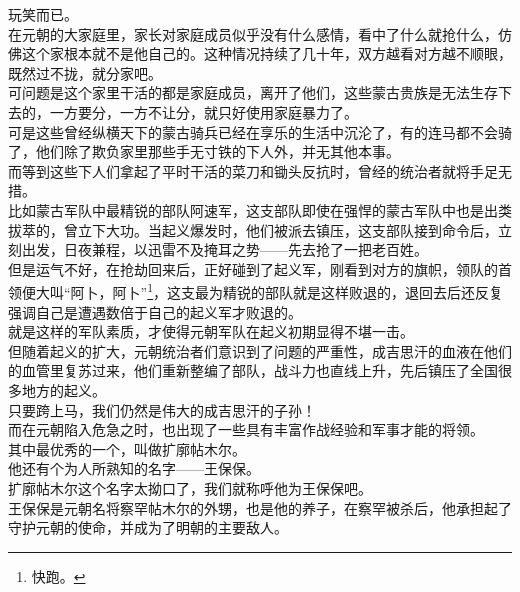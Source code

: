 \begin{multicols}{\theparacolNo}
玩笑而已。\\

在元朝的大家庭里，家长对家庭成员似乎没有什么感情，看中了什么就抢什么，仿佛这个家根本就不是他自己的。这种情况持续了几十年，双方越看对方越不顺眼，既然过不拢，就分家吧。\\

可问题是这个家里干活的都是家庭成员，离开了他们，这些蒙古贵族是无法生存下去的，一方要分，一方不让分，就只好使用家庭暴力了。\\

可是这些曾经纵横天下的蒙古骑兵已经在享乐的生活中沉沦了，有的连马都不会骑了，他们除了欺负家里那些手无寸铁的下人外，并无其他本事。\\

而等到这些下人们拿起了平时干活的菜刀和锄头反抗时，曾经的统治者就将手足无措。\\

比如蒙古军队中最精锐的部队阿速军，这支部队即使在强悍的蒙古军队中也是出类拔萃的，曾立下大功。当起义爆发时，他们被派去镇压，这支部队接到命令后，立刻出发，日夜兼程，以迅雷不及掩耳之势——先去抢了一把老百姓。\\

但是运气不好，在抢劫回来后，正好碰到了起义军，刚看到对方的旗帜，领队的首领便大叫“阿卜，阿卜”\footnote{快跑。}，这支最为精锐的部队就是这样败退的，退回去后还反复强调自己是遭遇数倍于自己的起义军才败退的。\\

就是这样的军队素质，才使得元朝军队在起义初期显得不堪一击。\\

但随着起义的扩大，元朝统治者们意识到了问题的严重性，成吉思汗的血液在他们的血管里复苏过来，他们重新整编了部队，战斗力也直线上升，先后镇压了全国很多地方的起义。\\

只要跨上马，我们仍然是伟大的成吉思汗的子孙！\\

而在元朝陷入危急之时，也出现了一些具有丰富作战经验和军事才能的将领。\\

其中最优秀的一个，叫做扩廓帖木尔。\\

他还有个为人所熟知的名字——王保保。\\

扩廓帖木尔这个名字太拗口了，我们就称呼他为王保保吧。\\

王保保是元朝名将察罕帖木尔的外甥，也是他的养子，在察罕被杀后，他承担起了守护元朝的使命，并成为了明朝的主要敌人。\\


\end{multicols}
